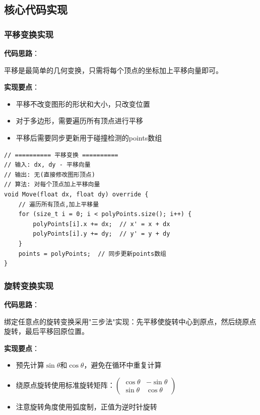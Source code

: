 \documentclass[12pt,a4paper]{article}
\begin{document}
\begin{tcolorbox}
\subsection{核心代码实现}

\subsubsection{平移变换实现}

\textbf{代码思路}：

平移是最简单的几何变换，只需将每个顶点的坐标加上平移向量即可。

\textbf{实现要点}：
\begin{itemize}
    \item 平移不改变图形的形状和大小，只改变位置
    \item 对于多边形，需要遍历所有顶点进行平移
    \item 平移后需要同步更新用于碰撞检测的points数组
\end{itemize}

\begin{lstlisting}[caption={平移变换函数}]
// ========== 平移变换 ==========
// 输入: dx, dy - 平移向量
// 输出: 无(直接修改图形顶点)
// 算法: 对每个顶点加上平移向量
void Move(float dx, float dy) override {
    // 遍历所有顶点,加上平移量
    for (size_t i = 0; i < polyPoints.size(); i++) {
        polyPoints[i].x += dx;  // x' = x + dx
        polyPoints[i].y += dy;  // y' = y + dy
    }
    points = polyPoints;  // 同步更新points数组
}
\end{lstlisting}

\subsubsection{旋转变换实现}

\textbf{代码思路}：

绑定任意点的旋转变换采用"三步法"实现：先平移使旋转中心到原点，然后绕原点旋转，最后平移回原位置。

\textbf{实现要点}：
\begin{itemize}
    \item 预先计算$\sin\theta$和$\cos\theta$，避免在循环中重复计算
    \item 绕原点旋转使用标准旋转矩阵：$\begin{pmatrix} \cos\theta & -\sin\theta \\ \sin\theta & \cos\theta \end{pmatrix}$
    \item 注意旋转角度使用弧度制，正值为逆时针旋转
\end{itemize}


\end{tcolorbox}
\end{document}
